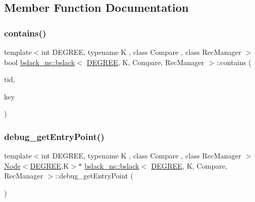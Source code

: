 \subsection{Member Function Documentation}
\mbox{\label{classbslack__ns_1_1bslack_ad7f1dc2680af04d1d3daff28550abf95}} 
\subsubsection{\texorpdfstring{contains()}{contains()}}
{\footnotesize\ttfamily template$<$int D\+E\+G\+R\+EE, typename K , class Compare , class Rec\+Manager $>$ \\
bool \hyperlink{classbslack__ns_1_1bslack}{bslack\+\_\+ns\+::bslack}$<$ \hyperlink{brown__sigouin__abtree__kcas_2adapter_8h_a5d88b17d70c985f2f2b8e987037fd6dd}{D\+E\+G\+R\+EE}, K, Compare, Rec\+Manager $>$\+::contains (\begin{DoxyParamCaption}\item[{const int}]{tid,  }\item[{const K \&}]{key }\end{DoxyParamCaption})}

\mbox{\label{classbslack__ns_1_1bslack_a86f277752d6bb5cf8eaf462353a2ae51}} 
\subsubsection{\texorpdfstring{debug\+\_\+get\+Entry\+Point()}{debug\_getEntryPoint()}}
{\footnotesize\ttfamily template$<$int D\+E\+G\+R\+EE, typename K , class Compare , class Rec\+Manager $>$ \\
\hyperlink{structbslack__ns_1_1Node}{Node}$<$\hyperlink{brown__sigouin__abtree__kcas_2adapter_8h_a5d88b17d70c985f2f2b8e987037fd6dd}{D\+E\+G\+R\+EE},K$>$$\ast$ \hyperlink{classbslack__ns_1_1bslack}{bslack\+\_\+ns\+::bslack}$<$ \hyperlink{brown__sigouin__abtree__kcas_2adapter_8h_a5d88b17d70c985f2f2b8e987037fd6dd}{D\+E\+G\+R\+EE}, K, Compare, Rec\+Manager $>$\+::debug\+\_\+get\+Entry\+Point (\begin{DoxyParamCaption}{ }\end{DoxyParamCaption})\hspace{0.3cm}{\ttfamily [inline]}}

